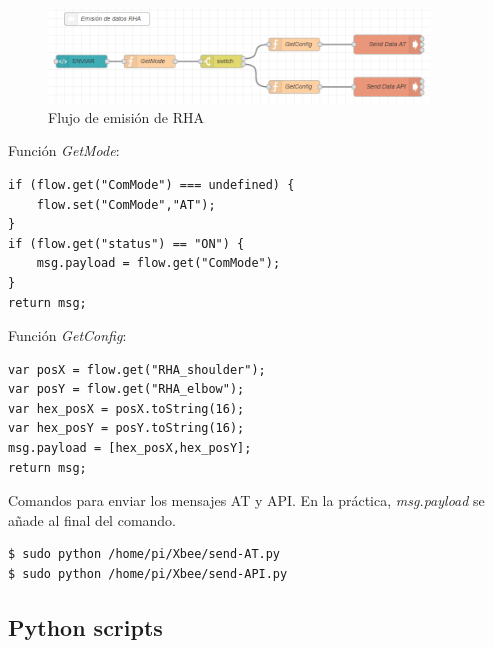 \begin{figure}[H]
\centering
\includegraphics[width=0.9\textwidth]{figuras/emisionFlowRHA.png}
\caption{Flujo de emisión de RHA}
\label{fig:emisionRHA}
\end{figure}

Función \textit{GetMode}:

\lstset{numbers=left,numberstyle=\tiny, language=Java, breaklines=true, basicstyle=\footnotesize, xleftmargin=25pt, framesep=8pt, numbersep=15pt}

\begin{lstlisting}[frame=leftline, caption={GetMode}, label=code:GetMode]
if (flow.get("ComMode") === undefined) {
    flow.set("ComMode","AT");
}
if (flow.get("status") == "ON") {
    msg.payload = flow.get("ComMode");
}
return msg;
\end{lstlisting}

Función \textit{GetConfig}:

\begin{lstlisting}[frame=leftline, caption={GetConfig}, label=code:GetConfig]
var posX = flow.get("RHA_shoulder");
var posY = flow.get("RHA_elbow");
var hex_posX = posX.toString(16);
var hex_posY = posY.toString(16);
msg.payload = [hex_posX,hex_posY];
return msg;
\end{lstlisting}

Comandos para enviar los mensajes AT y API. En la práctica, \textit{msg.payload} se añade al final del comando.


\begin{lstlisting}[frame=single, label=command:sendDataRHA]
$ sudo python /home/pi/Xbee/send-AT.py
$ sudo python /home/pi/Xbee/send-API.py
\end{lstlisting}

\subsection{Python scripts}

